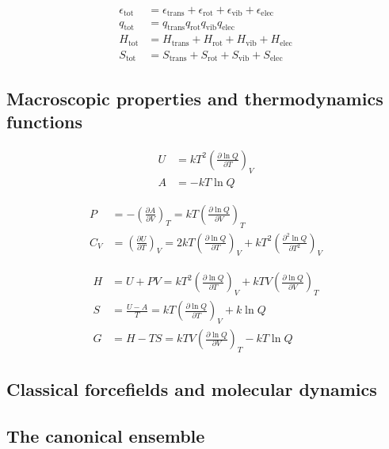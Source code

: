 \begin{align}
\epsilon_{\text{tot}} &= \epsilon_{\text{trans}} + \epsilon_{\text{rot}} + \epsilon_{\text{vib}} + \epsilon_{\text{elec}} \\
q_{\text{tot}} &= q_{\text{trans}} q_{\text{rot}} q_{\text{vib}} q_{\text{elec}} \\
H_{\text{tot}} &= H_{\text{trans}} + H_{\text{rot}} + H_{\text{vib}} + H_{\text{elec}} \\
S_{\text{tot}} &= S_{\text{trans}} + S_{\text{rot}} + S_{\text{vib}} + S_{\text{elec}}
\end{align}

\subsection{Macroscopic properties and thermodynamics functions}

\begin{align}
U &= kT^2 \left(\frac{\partial \ln Q}{\partial T}\right)_V \tag{14.17} \\
A &= -kT\ln Q \tag{14.18}
\end{align}

\begin{align}
P &= -\left(\frac{\partial A}{\partial V}\right)_T = kT\left(\frac{\partial \ln Q}{\partial V}\right)_T \tag{14.19} \\
C_V &= \left(\frac{\partial U}{\partial T}\right)_V = 2kT\left(\frac{\partial \ln Q}{\partial T}\right)_V + kT^2\left(\frac{\partial^2 \ln Q}{\partial T^2}\right)_V \tag{14.20}
\end{align}

\begin{align}
H &= U + PV = kT^2\left(\frac{\partial \ln Q}{\partial T}\right)_V + kTV\left(\frac{\partial \ln Q}{\partial V}\right)_T \tag{14.21} \\
S &= \frac{U-A}{T} = kT\left(\frac{\partial \ln Q}{\partial T}\right)_V + k\ln Q \tag{14.22} \\
G &= H - TS = kTV\left(\frac{\partial \ln Q}{\partial V}\right)_T - kT\ln Q \tag{14.23}
\end{align}

\subsection{Classical forcefields and molecular dynamics}

\subsection{The canonical ensemble}

